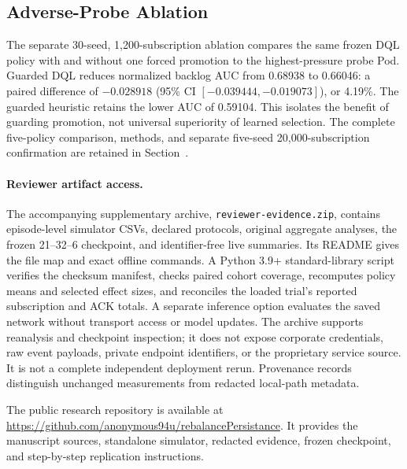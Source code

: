 \subsection{Adverse-Probe Ablation}
The separate 30-seed, 1,200-subscription ablation compares the same frozen DQL
policy with and without one forced promotion to the highest-pressure probe
Pod. Guarded DQL reduces normalized backlog AUC from 0.68938 to 0.66046:
a paired difference of $-0.028918$ (95\% CI $[-0.039444,-0.019073]$), or 4.19\%.
The guarded heuristic retains the lower AUC of 0.59104. This isolates the
benefit of guarding promotion, not universal superiority of learned selection.
The complete five-policy comparison, methods, and separate five-seed
20,000-subscription confirmation are retained in
Section~.
\paragraph{Reviewer artifact access.}
The accompanying supplementary archive, \texttt{reviewer-evidence.zip},
contains episode-level simulator CSVs, declared protocols, original aggregate
analyses, the frozen 21--32--6 checkpoint, and identifier-free live summaries.
Its README gives the file map and exact offline commands. A Python 3.9+
standard-library script verifies the checksum manifest, checks paired cohort
coverage, recomputes policy means and selected effect sizes, and reconciles
the loaded trial's reported subscription and ACK totals. A separate inference
option evaluates the saved network without transport access or model updates.
The archive supports reanalysis and checkpoint inspection; it does not expose
corporate credentials, raw event payloads, private endpoint identifiers, or
the proprietary service source. It is not a complete independent deployment
rerun. Provenance records distinguish unchanged measurements from redacted
local-path metadata.

The public research repository is available at
\url{https://github.com/anonymous94u/rebalancePersistance}.
It provides the manuscript sources, standalone simulator, redacted evidence,
frozen checkpoint, and step-by-step replication instructions.

